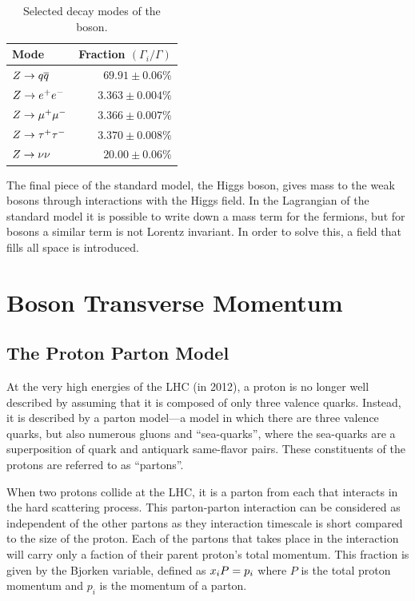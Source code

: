 \begin{table}[h]
\centering
{}
\begin{center}
    \begin{tabular}{@{}l  r@{}}
        \toprule
        Mode & Fraction $\left( \Gamma_{i} / \Gamma \right)$ \\
        \midrule
        $Z \to q \overline{q}$ & $69.91 \pm 0.06\%$ \\
        $Z \to e^{+} e^{-}$ & $3.363 \pm 0.004\%$ \\
        $Z \to \mu^{+} \mu^{-}$ & $3.366 \pm 0.007\%$ \\
        $Z \to \tau^{+} \tau^{-}$ & $3.370 \pm 0.008\%$ \\
        $Z \to \nu \nu$ & $20.00 \pm 0.06\%$ \\
        \bottomrule
    \end{tabular}
    \caption{
        Selected decay modes of the \Z boson.
    }
\label{table:z_decays}
\end{center}
\end{table}

The final piece of the standard model, the Higgs boson, gives mass to the weak
bosons through interactions with the Higgs field. In the Lagrangian of the
standard model it is possible to write down a mass term for the \spinhalf
fermions, but for \spinone bosons a similar term is not Lorentz invariant. In
order to solve this, a \spinzero field that fills all space is introduced.

\section{\texorpdfstring{\Z}{Z} Boson Transverse Momentum}

\subsection{The Proton Parton Model}
\label{ssec:parton_model}

At the very high energies of the LHC (\rootseight in 2012), a proton is no
longer well described by assuming that it is composed of only three valence
quarks. Instead, it is described by a parton model---a model in which there are
three valence quarks, but also numerous gluons and ``sea-quarks'', where the
sea-quarks are a superposition of quark and antiquark same-flavor pairs. These
constituents of the protons are referred to as ``partons''.

When two protons collide at the LHC, it is a parton from each that interacts in
the hard scattering process. This parton-parton interaction can be considered
as independent of the other partons as they interaction timescale is short
compared to the size of the proton. Each of the partons that takes place in the
interaction will carry only a faction of their parent proton's total momentum.
This fraction is given by the Bjorken \BjorkenX variable, defined as
$x_{i} P = p_{i}$ where $P$ is the total proton momentum and $p_{i}$ is the
momentum of a parton.

